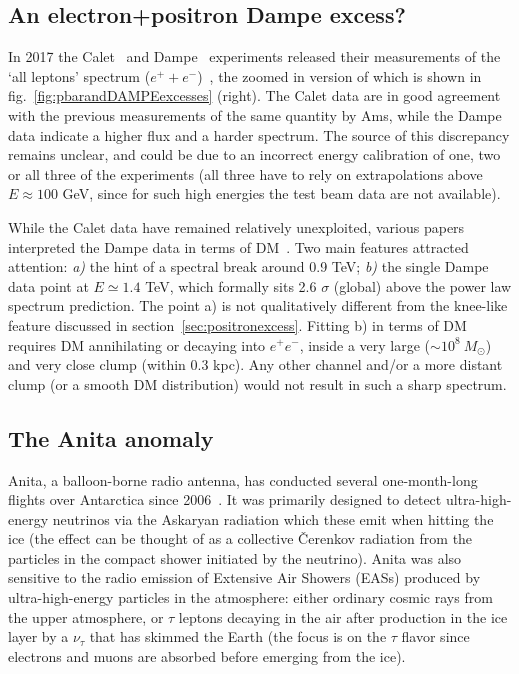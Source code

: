 \subsection{An electron+positron {\sc Dampe} excess?}\label{sec:DAMPE}
In 2017 the {\sc Calet}~\cite{Calet} and {\sc Dampe}~\cite{Dampe} experiments released 
their measurements of the `all leptons' spectrum ($e^++e^-$)~\cite{DAMPEepem,CALETepem}, the zoomed in version of which is shown in fig.~\ref{fig:pbarandDAMPEexcesses} (right). 
The {\sc Calet} data are in good agreement with the previous measurements of the same quantity by {\sc Ams}, while the {\sc Dampe} data indicate a higher flux and a harder spectrum. 
The source of this discrepancy remains unclear, 
and could be due to an incorrect energy calibration of one, two or all three of the experiments 
(all three have to rely on extrapolations above $E \approx 100$ GeV, since for such high energies the test beam data are not available). 


While the {\sc Calet} data have remained relatively unexploited, various papers interpreted the {\sc Dampe} data 
in terms of DM~\cite{DAMPEexcess}. Two main features attracted attention: {\em a)} the hint of a spectral break around 0.9 TeV; {\em b)} the single {\sc Dampe} data point at $E \simeq 1.4$ TeV, which formally sits 2.6 $\sigma$ (global) above the power law spectrum prediction. The point a) is not qualitatively different from the knee-like feature discussed in section~\ref{sec:positronexcess}. Fitting b) in terms of DM requires DM annihilating or decaying into $e^+e^-$, inside a very large ($\sim 10^8 \ M_\odot$) and very close clump (within 0.3 kpc). Any other channel and/or a more distant clump (or a smooth DM distribution) would not result in such a sharp spectrum. 





\subsection{The {\sc Anita} anomaly}\label{sec:ANITA}
{\sc Anita}, a balloon-borne radio antenna, has conducted several  one-month-long flights over Antarctica since 2006~\cite{Anita}. It was primarily designed to detect ultra-high-energy neutrinos via the Askaryan radiation which these emit when hitting the ice (the effect can be thought of as a collective \v Cerenkov radiation from the particles in the compact shower initiated by the neutrino). {\sc Anita} was also sensitive to the radio emission of Extensive Air Showers (EASs) produced by ultra-high-energy particles in the atmosphere: either ordinary cosmic rays from the upper atmosphere, or $\tau$ leptons decaying in the air after production in the ice layer by a $\nu_\tau$ that has skimmed the Earth (the focus is on the $\tau$ flavor since electrons and muons are absorbed before emerging from the ice). 


